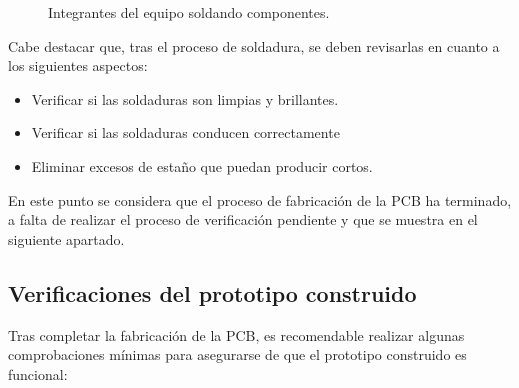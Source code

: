 \begin{enumerate}
    \begin{figure}[H]
    \centering
    \hfill
    \caption{Integrantes del equipo soldando componentes.}
    \end{figure}
    
    Cabe destacar que, tras el proceso de soldadura, se deben revisarlas en cuanto a los siguientes aspectos:
    \begin{itemize}
        \item Verificar si las soldaduras son limpias y brillantes.
        \item Verificar si las soldaduras conducen correctamente
        \item Eliminar excesos de estaño que puedan producir cortos.
    \end{itemize}
\end{enumerate}

En este punto se considera que el proceso de fabricación de la \ac{PCB} ha terminado, a falta de realizar el proceso de verificación pendiente y que se muestra en el siguiente apartado.

\subsection{Verificaciones del prototipo construido}

Tras completar la fabricación de la \ac{PCB}, es recomendable realizar algunas comprobaciones mínimas para asegurarse de que el prototipo construido es funcional:

